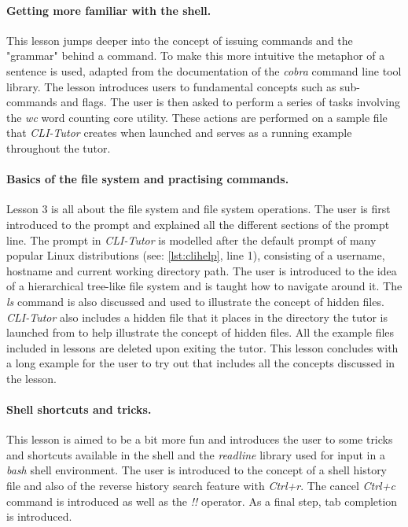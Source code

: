 \paragraph{Getting more familiar with the shell.} This lesson jumps deeper into
the concept of issuing commands and the "grammar" behind a command. To make
this more intuitive the metaphor of a sentence is used, adapted from the
documentation of the \textit{cobra} command line tool
library\cite{franciacobra}. The lesson introduces users to fundamental concepts
such as sub-commands and flags. The user is then asked to perform a series of
tasks involving the \textit{wc} word counting core utility. These actions are
performed on a sample file that \textit{CLI-Tutor} creates when launched and
serves as a running example throughout the tutor.

\paragraph{Basics of the file system and practising commands.} Lesson 3 is all
about the file system and file system operations. The user is first introduced
to the prompt and explained all the different sections of the prompt line. The
prompt in \textit{CLI-Tutor} is modelled after the default prompt of many popular
Linux distributions (see: \autoref{lst:clihelp}, line 1), consisting of a
username, hostname and current working directory path. The user is introduced
to the idea of a hierarchical tree-like file system and is taught how to
navigate around it. The \textit{ls} command is also discussed and used to
illustrate the concept of hidden files. \textit{CLI-Tutor} also includes a
hidden file that it places in the directory the tutor is launched from to help
illustrate the concept of hidden files. All the example files included in
lessons are deleted upon exiting the tutor. This lesson concludes with a long
example for the user to try out that includes all the concepts discussed in the
lesson.

\paragraph{Shell shortcuts and tricks.} This lesson is aimed to be a bit more
fun and introduces the user to some tricks and shortcuts available in the shell
and the \textit{readline}\cite{ramey_fox_readline} library used for input in a
\textit{bash} shell environment. The user is introduced to the concept of a
shell history file and also of the reverse history search feature with
\textit{Ctrl+r}. The cancel \textit{Ctrl+c} command is introduced as well
as the \textit{!!} operator. As a final step, tab completion is introduced.

